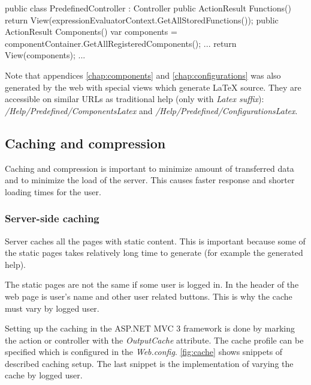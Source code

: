 \begin{Csharp}[label=code:genHelp,caption={Example of two action methods which lists all the defined functions and components}]
public class PredefinedController : Controller {
	public ActionResult Functions() {
		return View(expressionEvaluatorContext.GetAllStoredFunctions());
	}
	public ActionResult Components() {
		var components = componentContainer.GetAllRegisteredComponents();
		...
		return View(components);
	}
	...
}
\end{Csharp}

Note that appendices \ref{chap:components} and \ref{chap:configurations} was also generated by the web with special views which generate \LaTeX{} source.
They are accessible on similar URLs as traditional help (only with \emph{Latex suffix}): \emph{/Help/Predefined/ComponentsLatex} and \emph{/Help/Predefined/ConfigurationsLatex}.

\subsection{Caching and compression}

Caching and compression is important to minimize amount of transferred data and to minimize the load of the server.
This causes faster response and shorter loading times for the user.


\subsubsection{Server-side caching}

Server caches all the pages with static content.
This is important because some of the static pages takes relatively long time to generate (for example the generated help).

The static pages are not the same if some user is logged in.
In the header of the web page is user's name and other user related buttons.
This is why the cache must vary by logged user.

Setting up the caching in the ASP.NET MVC 3 framework is done by marking the action or controller with the \emph{OutputCache} attribute.
The cache profile can be specified which is configured in the \emph{Web.config}.
\autoref{fig:cache} shows snippets of described caching setup.
The last snippet is the implementation of varying the cache by logged user.



